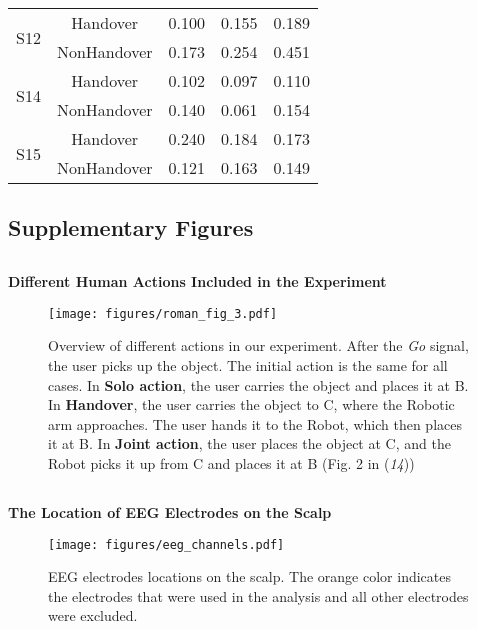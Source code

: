 \begin{table}[h!]
{\begin{tabular}{ccccc}
        \midrule
        \multirow{2}{*}{S12} & Handover & 0.100 & 0.155 & 0.189 \\& NonHandover & 0.173 & 0.254 & 0.451 \\
        \midrule
        \multirow{2}{*}{S14} & Handover & 0.102 & 0.097 & 0.110 \\& NonHandover & 0.140 & 0.061 & 0.154 \\
        \midrule
        \multirow{2}{*}{S15} & Handover & 0.240 & 0.184 & 0.173 \\& NonHandover & 0.121 & 0.163 & 0.149 \\
        \bottomrule
    \end{tabular}
    }
    \label{tab:erds}
\end{table}

\newpage
\subsection*{Supplementary Figures}

\subsection*{}
\textbf{Different Human Actions Included in the Experiment}
\begin{figure}[H]
       \centering
         \texttt{[image: figures/roman\_fig\_3.pdf]}  
     \caption{Overview of different actions in our experiment. After the \emph{Go} signal, the user picks up the object. The initial action is the same for all cases. In \textbf{Solo action}, the user carries the object and places it at B. In \textbf{Handover}, the user carries the object to C, where the Robotic arm approaches. The user hands it to the Robot, which then places it at B. In \textbf{Joint action}, the user places the object at C, and the Robot picks it up from C and places it at B (Fig. 2 in (\emph{14}))}
    \label{fig:experiment_overview}
\end{figure}

\subsection*{}
\textbf{The Location of EEG Electrodes on the Scalp}
\begin{figure}[H]
    \centering
    \texttt{[image: figures/eeg\_channels.pdf]}
    \caption{EEG electrodes locations on the scalp. The orange color indicates the electrodes that were used in the analysis and all other electrodes were excluded.}
    \label{fig:eeg_channels}
\end{figure}

